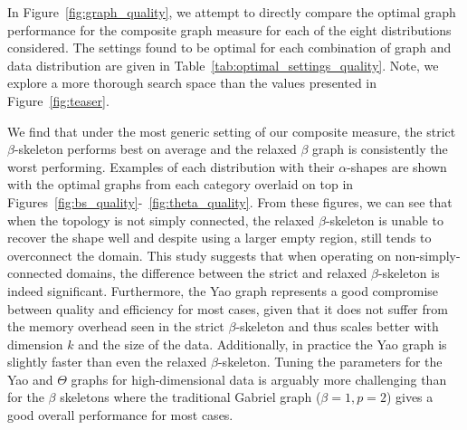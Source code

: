 In Figure~\ref{fig:graph_quality}, we attempt to directly compare the optimal graph performance for the composite graph measure for each of the eight distributions considered.
%
The settings found to be optimal for each combination of graph and data distribution are given in Table~\ref{tab:optimal_settings_quality}.
%
Note, we explore a more thorough search space than the values presented in Figure~\ref{fig:teaser}.
%

%
We find that under the most generic setting of our composite measure, the strict $\beta$-skeleton performs best on average and the relaxed $\beta$ graph is consistently the worst performing.
%
Examples of each distribution with their $\alpha$-shapes are shown with the optimal graphs from each category overlaid on top in Figures~\ref{fig:bs_quality}-~\ref{fig:theta_quality}.
%
From these figures, we can see that when the topology is not simply connected, the relaxed $\beta$-skeleton is unable to recover the shape well and despite using a larger empty region, still tends to overconnect the domain.
%
This study suggests that when operating on non-simply-connected domains, the difference between the strict and relaxed $\beta$-skeleton is indeed significant.
%
Furthermore, the Yao graph represents a good compromise between quality and efficiency for most cases, given that it does not suffer from the memory overhead seen in the strict $\beta$-skeleton and thus scales better with dimension $k$ and the size of the data.
%
Additionally, in practice the Yao graph is slightly faster than even the relaxed $\beta$-skeleton.
%
Tuning the parameters for the Yao and $\Theta$ graphs for high-dimensional data is arguably more challenging than for the $\beta$ skeletons where the traditional Gabriel graph ($\beta=1, p=2$) gives a good overall performance for most cases.

